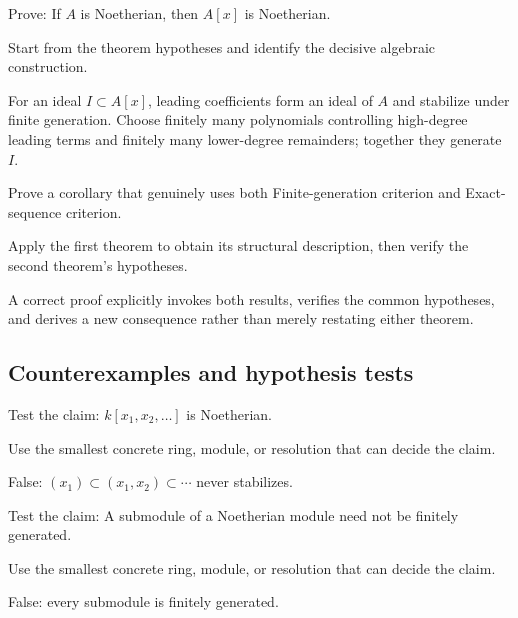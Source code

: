 \begin{exercise}\label{exr:v15-expand-08}
Prove: If $A$ is Noetherian, then $A[x]$ is Noetherian.
\end{exercise}
\begin{hint}
Start from the theorem hypotheses and identify the decisive algebraic construction.
\end{hint}
\begin{solution}
For an ideal $I\subset A[x]$, leading coefficients form an ideal of $A$ and stabilize under finite generation. Choose finitely many polynomials controlling high-degree leading terms and finitely many lower-degree remainders; together they generate $I$.
\end{solution}

\begin{exercise}\label{exr:v15-expand-09}
Prove a corollary that genuinely uses both Finite-generation criterion and Exact-sequence criterion.
\end{exercise}
\begin{hint}
Apply the first theorem to obtain its structural description, then verify the second theorem's hypotheses.
\end{hint}
\begin{solution}
A correct proof explicitly invokes both results, verifies the common hypotheses, and derives a new consequence rather than merely restating either theorem.
\end{solution}

\subsection*{Counterexamples and hypothesis tests}

\begin{exercise}\label{exr:v15-expand-10}
Test the claim: $k[x_1,x_2,\ldots]$ is Noetherian.
\end{exercise}
\begin{hint}
Use the smallest concrete ring, module, or resolution that can decide the claim.
\end{hint}
\begin{solution}
False: $(x_1)\subset(x_1,x_2)\subset\cdots$ never stabilizes.
\end{solution}

\begin{exercise}[Submodule]\label{exr:v15-expand-11}
Test the claim: A submodule of a Noetherian module need not be finitely generated.
\end{exercise}
\begin{hint}
Use the smallest concrete ring, module, or resolution that can decide the claim.
\end{hint}
\begin{solution}
False: every submodule is finitely generated.
\end{solution}


